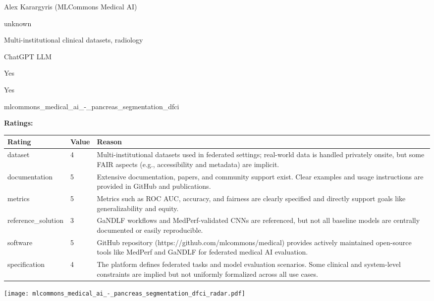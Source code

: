 {{\begin{description}[labelwidth=4cm, labelsep=1em, leftmargin=4cm, itemsep=0.1em, parsep=0em]
  \item[contact.name:] Alex Karargyris (MLCommons Medical AI)
  \item[contact.email:] unknown
  \item[datasets.links.name:] Multi-institutional clinical datasets, radiology
  \item[results.links.name:] ChatGPT LLM
  \item[fair.reproducible:] Yes
  \item[fair.benchmark\_ready:] Yes
  \item[id:] mlcommons\_medical\_ai\_-\_pancreas\_segmentation\_dfci
  \item[Citations:] \cite{karargyris2023federated}
\end{description}

{\bf Ratings:} ~ \\

\begin{tabular}{p{} p{} p{}}
\hline
Rating & Value & Reason \\
\hline
dataset & 4 & Multi-institutional datasets used in federated settings; real-world data is handled
privately onsite, but some FAIR aspects (e.g., accessibility and metadata) are implicit.
 \\
documentation & 5 & Extensive documentation, papers, and community support exist. Clear examples and usage
instructions are provided in GitHub and publications.
 \\
metrics & 5 & Metrics such as ROC AUC, accuracy, and fairness are clearly specified and directly
support goals like generalizability and equity.
 \\
reference\_solution & 3 & GaNDLF workflows and MedPerf-validated CNNs are referenced, but not all baseline models
are centrally documented or easily reproducible.
 \\
software & 5 & GitHub repository (https://github.com/mlcommons/medical) provides actively maintained
open-source tools like MedPerf and GaNDLF for federated medical AI evaluation.
 \\
specification & 4 & The platform defines federated tasks and model evaluation scenarios. Some clinical and
system-level constraints are implied but not uniformly formalized across all use cases.
 \\
\hline
\end{tabular}

\texttt{[image: mlcommons\_medical\_ai\_-\_pancreas\_segmentation\_dfci\_radar.pdf]}
}}
\clearpage